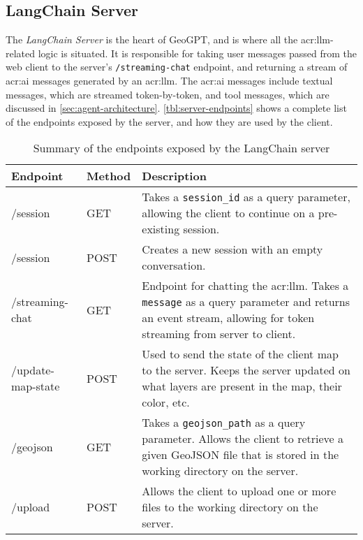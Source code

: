 \subsection{LangChain Server}\label{subsec:langchain-server}
\label{subsec:langchain-server-architecture}

The \textit{LangChain Server} is the heart of GeoGPT, and is where all the \gls{acr:llm}-related logic is situated. It is responsible for taking user messages passed from the web client to the server's \texttt{/streaming-chat} endpoint, and returning a stream of \acrshort{acr:ai} messages generated by an \acrshort{acr:llm}. The \acrshort{acr:ai} messages include textual messages, which are streamed token-by-token, and tool messages, which are discussed in \autoref{sec:agent-architecture}. \autoref{tbl:server-endpoints} shows a complete list of the endpoints exposed by the server, and how they are used by the client.

\begin{table}[H]
    \centering
    \caption[API endpoints exposed by GeoGPT's LangChain server]{Summary of the endpoints exposed by the LangChain server}
    \label{tbl:server-endpoints}
    \begin{tabular}{p{}p{}p{}}
        \toprule
        \textbf{Endpoint} & \textbf{Method} & \textbf{Description}                                                                                                                                                         \\
        \midrule
        /session          & GET             & Takes a \texttt{session\_id} as a query parameter, allowing the client to continue on a pre-existing session.                                                                \\
        /session          & POST            & Creates a new session with an empty conversation.                                                                                                                            \\
        /streaming-chat   & GET             & Endpoint for chatting the \acrshort{acr:llm}. Takes a \texttt{message} as a query parameter and returns an event stream, allowing for token streaming from server to client. \\
        /update-map-state & POST            & Used to send the state of the client map to the server. Keeps the server updated on what layers are present in the map, their color, etc.                                    \\
        /geojson          & GET             & Takes a \texttt{geojson\_path} as a query parameter. Allows the client to retrieve a given GeoJSON file that is stored in the working directory on the server.               \\
        /upload           & POST            & Allows the client to upload one or more files to the working directory on the server.                                                                                        \\
        \bottomrule
    \end{tabular}
\end{table}

